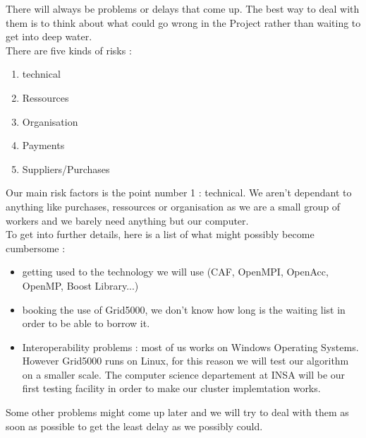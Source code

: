There will always be problems or delays that come up. The best way to deal with them is to think about what could go wrong in the Project rather than waiting to get into deep water.\\
There are five kinds of risks :
\begin{enumerate}
	\item technical
	\item Ressources
	\item Organisation
	\item Payments
	\item Suppliers/Purchases
\end{enumerate}
Our main risk factors is the point number 1 : technical. We aren't dependant to anything like purchases, ressources or organisation as we are a small group of workers and we barely need anything but our computer.\\
To get into further details, here is a list of what might possibly become cumbersome :
\begin{itemize}
	\item getting used to the technology we will use (CAF, OpenMPI, OpenAcc, OpenMP, Boost Library...)
	\item booking the use of Grid5000, we don't know how long is the waiting list in order to be able to borrow it.
	\item Interoperability problems : most of us works on Windows Operating Systems. However Grid5000 runs on Linux, for this reason we will test our algorithm on a smaller scale. The computer science departement at INSA will be our first testing facility in order to make our cluster implemtation works.
\end{itemize}
Some other problems might come up later and we will try to deal with them as soon as possible to get the least delay as we possibly could.~\\
